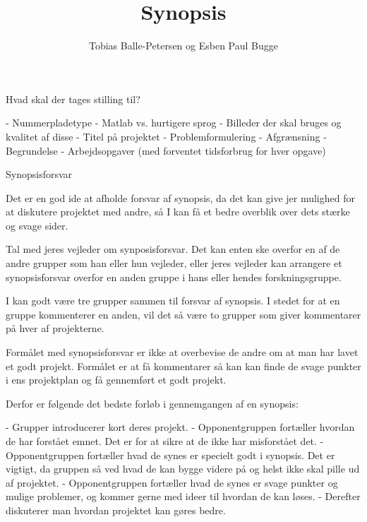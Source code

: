 \documentclass[10pt,a4paper,final]{report}
\author{Tobias Balle-Petersen og Esben Paul Bugge}
\title{Synopsis}
\begin{document}
\maketitle
Hvad skal der tages stilling til?

- Nummerpladetype
- Matlab vs. hurtigere sprog
- Billeder der skal bruges og kvalitet af disse
- Titel på projektet
- Problemformulering
- Afgrænsning
- Begrundelse
- Arbejdsopgaver (med forventet tidsforbrug for hver opgave)

Synopsisforsvar

Det er en god ide at afholde forsvar af synopsis, da det kan give jer mulighed for at diskutere projektet med andre, så I kan få et bedre overblik over dets stærke og svage sider.

Tal med jeres vejleder om synposisforsvar. Det kan enten ske overfor en af de andre grupper som han eller hun vejleder, eller jeres vejleder kan arrangere et synopsisforsvar overfor en anden gruppe i hans eller hendes forskningsgruppe.

I kan godt være tre grupper sammen til forsvar af synopsis. I stedet for at en gruppe kommenterer en anden, vil det så være to grupper som giver kommentarer på hver af projekterne.

Formålet med synopsisforsvar er ikke at overbevise de andre om at man har lavet et godt projekt. Formålet er at få kommentarer så kan kan finde de svage punkter i ens projektplan og få gennemført et godt projekt.

Derfor er følgende det bedste forløb i gennemgangen af en synopsis:

- Grupper introducerer kort deres projekt.
- Opponentgruppen fortæller hvordan de har forstået emnet. Det er for at sikre at de ikke har misforstået det.
- Opponentgruppen fortæller hvad de synes er specielt godt i synopsis. Det er vigtigt, da gruppen så ved hvad de kan bygge videre på og helst ikke skal pille ud af projektet.
- Opponentgruppen fortæller hvad de synes er svage punkter og mulige problemer, og kommer gerne med ideer til hvordan de kan løses.
- Derefter diskuterer man hvordan projektet kan gøres bedre.
\end{document}

